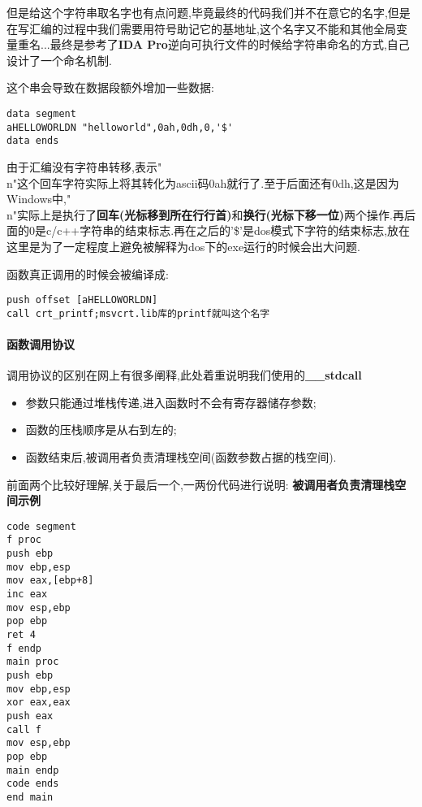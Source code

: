\documentclass{article}
\begin{document}
但是给这个字符串取名字也有点问题,毕竟最终的代码我们并不在意它的名字,但是在写汇编的过程中我们需要用符号助记它的基地址,这个名字又不能和其他全局变量重名...最终是参考了\textbf{IDA Pro}逆向可执行文件的时候给字符串命名的方式,自己设计了一个命名机制.


这个串会导致在数据段额外增加一些数据:

\begin{verbatim}
data segment
aHELLOWORLDN "helloworld",0ah,0dh,0,'$'
data ends
\end{verbatim}

由于汇编没有字符串转移,表示"\\n"这个回车字符实际上将其转化为ascii码0ah就行了.至于后面还有0dh,这是因为Windows中,"\\n"实际上是执行了\textbf{回车(光标移到所在行行首)}和\textbf{换行(光标下移一位)}两个操作.再后面的0是c/c++字符串的结束标志.再在之后的'\$'是dos模式下字符的结束标志,放在这里是为了一定程度上避免被解释为dos下的exe运行的时候会出大问题.


函数真正调用的时候会被编译成:

\begin{verbatim}
push offset [aHELLOWORLDN]
call crt_printf;msvcrt.lib库的printf就叫这个名字
\end{verbatim}


\paragraph{函数调用协议}

调用协议的区别在网上有很多阐释,此处着重说明我们使用的\textbf{\_\_stdcall}

\begin{itemize}
\item 参数只能通过堆栈传递,进入函数时不会有寄存器储存参数;
\item 函数的压栈顺序是从右到左的;
\item  函数结束后,被调用者负责清理栈空间(函数参数占据的栈空间).
\end{itemize}

前面两个比较好理解,关于最后一个,一两份代码进行说明:
\textbf{被调用者负责清理栈空间示例}

\begin{verbatim}
code segment
f proc
push ebp
mov ebp,esp
mov eax,[ebp+8]
inc eax
mov esp,ebp
pop ebp
ret 4
f endp
main proc
push ebp
mov ebp,esp
xor eax,eax
push eax
call f
mov esp,ebp
pop ebp
main endp
code ends
end main
\end{verbatim}
\end{document}
